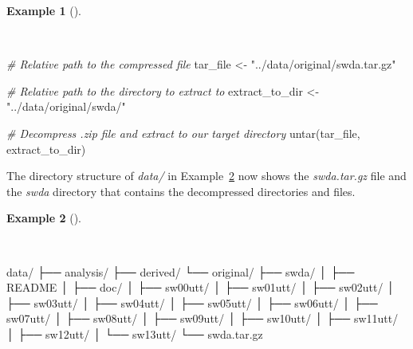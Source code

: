 \documentclass[
  letterpaper,
  DIV=11,
  numbers=noendperiod]{scrreprt}
\newenvironment{Shaded}{\begin{snugshade}}{\end{snugshade}}
\newcommand{\CommentTok}[1]{\textcolor[rgb]{0.00,0.00,0.00}{\textit{#1}}}
\newcommand{\ExtensionTok}[1]{\textcolor[rgb]{0.00,0.00,0.00}{#1}}
\newcommand{\FunctionTok}[1]{\textcolor[rgb]{0.00,0.00,0.00}{#1}}
\newcommand{\NormalTok}[1]{\textcolor[rgb]{0.00,0.00,0.00}{#1}}
\newcommand{\OtherTok}[1]{\textcolor[rgb]{0.00,0.00,0.00}{#1}}
\newcommand{\StringTok}[1]{\textcolor[rgb]{0.00,0.00,0.00}{#1}}
\theoremstyle{definition}
\newtheorem{example}{Example}[chapter]
\theoremstyle{remark}
\begin{document}
\begin{example}[]\protect\hypertarget{exm-ad-swda-decompress-file}{}\label{exm-ad-swda-decompress-file}

~

\begin{Shaded}
\begin{Highlighting}[]
\CommentTok{\# Relative path to the compressed file}
\NormalTok{tar\_file }\OtherTok{\textless{}{-}} \StringTok{"../data/original/swda.tar.gz"}

\CommentTok{\# Relative path to the directory to extract to}
\NormalTok{extract\_to\_dir }\OtherTok{\textless{}{-}} \StringTok{"../data/original/swda/"}

\CommentTok{\# Decompress .zip file and extract to our target directory}
\FunctionTok{untar}\NormalTok{(tar\_file, extract\_to\_dir)}
\end{Highlighting}
\end{Shaded}

\end{example}

The directory structure of \emph{data/} in
Example~\ref{exm-ad-swda-decompress-location} now shows the
\emph{swda.tar.gz} file and the \emph{swda} directory that contains the
decompressed directories and files.

\begin{example}[]\protect\hypertarget{exm-ad-swda-decompress-location}{}\label{exm-ad-swda-decompress-location}

~

\begin{Shaded}
\begin{Highlighting}[]
\ExtensionTok{data/}
\ExtensionTok{├──}\NormalTok{ analysis/}
\ExtensionTok{├──}\NormalTok{ derived/}
\ExtensionTok{└──}\NormalTok{ original/}
    \ExtensionTok{├──}\NormalTok{ swda/}
    \ExtensionTok{│}\NormalTok{   ├── README}
    \ExtensionTok{│}\NormalTok{   ├── doc/}
    \ExtensionTok{│}\NormalTok{   ├── sw00utt/}
    \ExtensionTok{│}\NormalTok{   ├── sw01utt/}
    \ExtensionTok{│}\NormalTok{   ├── sw02utt/}
    \ExtensionTok{│}\NormalTok{   ├── sw03utt/}
    \ExtensionTok{│}\NormalTok{   ├── sw04utt/}
    \ExtensionTok{│}\NormalTok{   ├── sw05utt/}
    \ExtensionTok{│}\NormalTok{   ├── sw06utt/}
    \ExtensionTok{│}\NormalTok{   ├── sw07utt/}
    \ExtensionTok{│}\NormalTok{   ├── sw08utt/}
    \ExtensionTok{│}\NormalTok{   ├── sw09utt/}
    \ExtensionTok{│}\NormalTok{   ├── sw10utt/}
    \ExtensionTok{│}\NormalTok{   ├── sw11utt/}
    \ExtensionTok{│}\NormalTok{   ├── sw12utt/}
    \ExtensionTok{│}\NormalTok{   └── sw13utt/}
    \ExtensionTok{└──}\NormalTok{ swda.tar.gz}
\end{Highlighting}
\end{Shaded}

\end{example}
\end{document}
